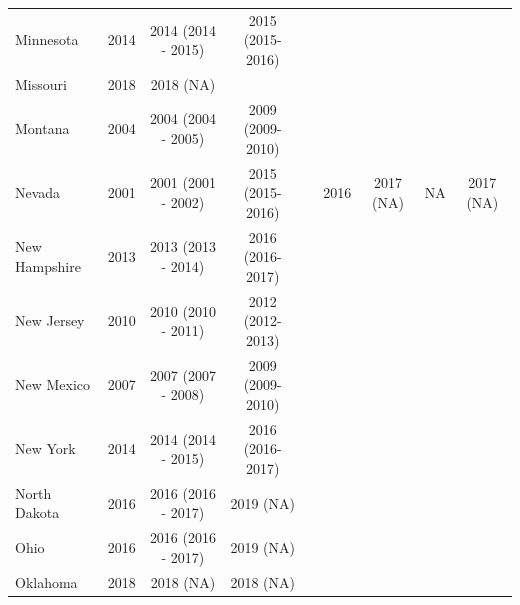 \documentclass[12pt]{article}%
\begin{document}
\begin{appendices}
\begin{table}[htp!]
\begin{adjustbox}{width=\textwidth}
\begin{tabular}{@{}lccclcccc@{}}
Minnesota     & 2014       & 2014 (2014 - 2015)                         & 2015 (2015-2016)                          &  &            &                    &              &                             \\
Missouri      & 2018       & 2018 (NA)                                  &                                           &  &            &                    &              &                             \\
Montana       & 2004       & 2004 (2004 - 2005)                         & 2009 (2009-2010)                          &  &            &                    &              &                             \\
Nevada        & 2001       & 2001 (2001 - 2002)                         & 2015 (2015-2016)                          &  & 2016       & 2017 (NA)          & NA           & 2017 (NA)                   \\
New Hampshire & 2013       & 2013 (2013 - 2014)                         & 2016 (2016-2017)                          &  &            &                    &              &                             \\
New Jersey    & 2010       & 2010 (2010 - 2011)                         & 2012 (2012-2013)                          &  &            &                    &              &                             \\
New Mexico    & 2007       & 2007 (2007 - 2008)                         & 2009 (2009-2010)                          &  &            &                    &              &                             \\
New York      & 2014       & 2014 (2014 - 2015)                         & 2016 (2016-2017)                          &  &            &                    &              &                             \\
North Dakota  & 2016       & 2016 (2016 - 2017)                         & 2019 (NA)                                 &  &            &                    &              &                             \\
Ohio          & 2016       & 2016 (2016 - 2017)                         & 2019 (NA)                                 &  &            &                    &              &                             \\
Oklahoma      & 2018       & 2018 (NA)                                  & 2018 (NA)                                 &  &            &                    &              &                             \\

\end{tabular}
\end{adjustbox}
\end{table}
\end{appendices}
\end{document}
